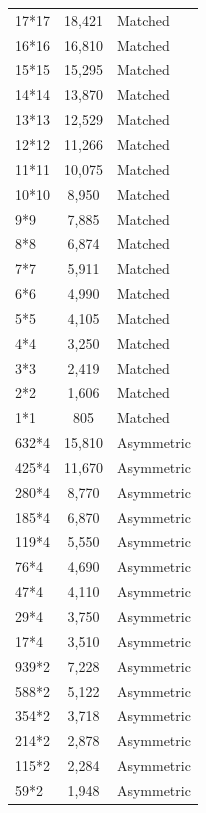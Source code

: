 \documentclass[conference]{IEEEtran}
\begin{document}
\begin{table}[ht]
\begin{tabular}{lcl}
17*17      & 18,421          & Matched \\
16*16      & 16,810          & Matched \\
15*15      & 15,295          & Matched \\
14*14      & 13,870          & Matched \\
13*13      & 12,529          & Matched \\
12*12      & 11,266          & Matched \\
11*11      & 10,075          & Matched \\
10*10      & 8,950           & Matched \\
9*9        & 7,885           & Matched \\
8*8        & 6,874           & Matched \\
7*7        & 5,911           & Matched \\
6*6        & 4,990           & Matched \\
5*5        & 4,105           & Matched \\
4*4        & 3,250           & Matched \\
3*3        & 2,419           & Matched \\
2*2        & 1,606           & Matched \\
1*1        & 805             & Matched \\
632*4      & 15,810          & Asymmetric \\
425*4      & 11,670          & Asymmetric \\
280*4      & 8,770           & Asymmetric \\
185*4      & 6,870           & Asymmetric \\
119*4      & 5,550           & Asymmetric \\
76*4       & 4,690           & Asymmetric \\
47*4       & 4,110           & Asymmetric \\
29*4       & 3,750           & Asymmetric \\
17*4       & 3,510           & Asymmetric \\
939*2      & 7,228           & Asymmetric \\
588*2      & 5,122           & Asymmetric \\
354*2      & 3,718           & Asymmetric \\
214*2      & 2,878           & Asymmetric \\
115*2      & 2,284           & Asymmetric \\
59*2       & 1,948           & Asymmetric \\

\end{tabular}
\end{table}
\end{document}
